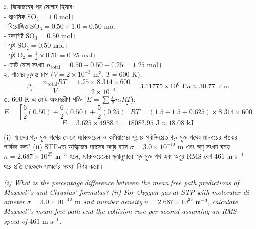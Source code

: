 \documentclass[12pt, a4paper]{article}
\begin{document}
{\vspace{1em}

\begin{tcolorbox}[solutionbox={সমাধান (Solution)}]
\noindent
১. বিয়োজনের পর মোলার হিসাব: \\
- প্রাথমিক $\text{SO}_3 = 1.0\text{ mol}$। \\
- বিয়োজিত $\text{SO}_3 = 0.50 \times 1.0 = 0.50\text{ mol}$। \\
- অবশিষ্ট $\text{SO}_3 = 0.50\text{ mol}$। \\
- সৃষ্ট $\text{SO}_2 = 0.50\text{ mol}$। \\
- সৃষ্ট $\text{O}_2 = \frac{1}{2} \times 0.50 = 0.25\text{ mol}$। \\
- মোট মোল সংখ্যা $n_{\text{total}} = 0.50 + 0.50 + 0.25 = 1.25\text{ mol}$। \\
২. পাত্রের চূড়ান্ত চাপ ($V = 2 \times 10^{-3}\text{ m}^3$, $T = 600\text{ K}$):
\[ P_f = \frac{n_{\text{total}} R T}{V} = \frac{1.25 \times 8.314 \times 600}{2 \times 10^{-3}} = 3.11775 \times 10^6\text{ Pa} \approx 30.77\text{ atm} \]
৩. $600\text{ K}$-এ মোট অভ্যন্তরীণ শক্তি ($E = \sum \frac{f_i}{2} n_i R T$):
\[ E = \left[\frac{6}{2}(0.50) + \frac{6}{2}(0.50) + \frac{5}{2}(0.25)\right] R T = (1.5 + 1.5 + 0.625) \times 8.314 \times 600 \]
\[ E = 3.625 \times 4988.4 = 18082.95\text{ J} \approx 18.08\text{ kJ} \]
\end{tcolorbox}
\begin{tcolorbox}[questionbox={প্রশ্ন (Question) 10}]
\noindent
(i) গ্যাসের গড় মুক্ত পথের ক্ষেত্রে ম্যাক্সওয়েল ও ক্লসিয়াসের সূত্রের পূর্বাভিপ্রেত গড় মুক্ত পথের মানদ্বয়ের শতকরা পার্থক্য কত? (ii) STP-তে অক্সিজেন গ্যাসের অণুর ব্যাস $\sigma = 3.0 \times 10^{-10}\text{ m}$ এবং অণু সংখ্যা ঘনত্ব $n = 2.687 \times 10^{25}\text{ m}^{-3}$ হলে, ম্যাক্সওয়েলের সূত্রানুসারে গড় মুক্ত পথ এবং অণুর RMS বেগ $461\text{ m s}^{-1}$ ধরে প্রতি সেকেন্ডে সংঘর্ষের সংখ্যা নির্ণয় করো।

\vspace{0.8em}
\begin{english}
\noindent\textit{\color{darkgray}
(i) What is the percentage difference between the mean free path predictions of Maxwell's and Clausius' formulas? (ii) For Oxygen gas at STP with molecular diameter $\sigma = 3.0 \times 10^{-10}\text{ m}$ and number density $n = 2.687 \times 10^{25}\text{ m}^{-3}$, calculate Maxwell's mean free path and the collision rate per second assuming an RMS speed of $461\text{ m s}^{-1}$.
}
\end{english}
\end{tcolorbox}

}
\end{document}
